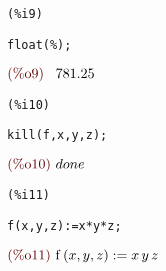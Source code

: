 \documentclass[12pt]{article}
\begin{document}
\noindent
\begin{minipage}[t]{8ex}{\color{red}\bf
\begin{verbatim}
(%i9) 
\end{verbatim}}
\end{minipage}
\begin{minipage}[t]{\textwidth}{\color{blue}
\begin{verbatim}
float(%);
\end{verbatim}}
\end{minipage}
\begin{math}\displaystyle
\parbox{8ex}{\color{labelcolor}(\%o9) }
781.25
\end{math}


\noindent
\begin{minipage}[t]{8ex}{\color{red}\bf
\begin{verbatim}
(%i10) 
\end{verbatim}}
\end{minipage}
\begin{minipage}[t]{\textwidth}{\color{blue}
\begin{verbatim}
kill(f,x,y,z);
\end{verbatim}}
\end{minipage}
\begin{math}\displaystyle
\parbox{8ex}{\color{labelcolor}(\%o10) }
done
\end{math}


\noindent
\begin{minipage}[t]{8ex}{\color{red}\bf
\begin{verbatim}
(%i11) 
\end{verbatim}}
\end{minipage}
\begin{minipage}[t]{\textwidth}{\color{blue}
\begin{verbatim}
f(x,y,z):=x*y*z;
\end{verbatim}}
\end{minipage}
\begin{math}\displaystyle
\parbox{8ex}{\color{labelcolor}(\%o11) }
\mathrm{f}\left( x,y,z\right) :=x\,y\,z
\end{math}
\end{document}

